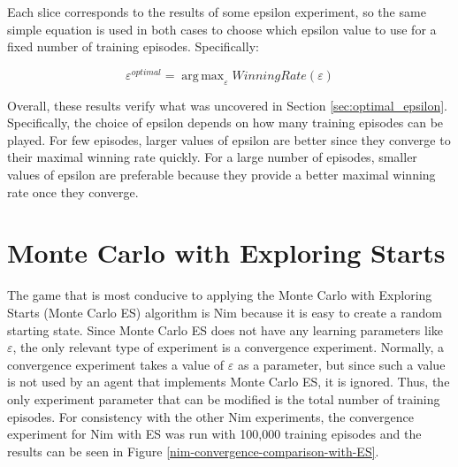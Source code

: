 \documentclass[11pt,a4paper,twoside,openright]{report}
\newcommand{\argmax}{\mathop{\mathrm{arg\,max}}}
\begin{document}
Each slice corresponds to the results of some epsilon experiment, so the same simple equation is used  in both cases to choose which epsilon value to use for a fixed number of training episodes. Specifically:

\begin{equation}
	\varepsilon^{optimal} = \argmax_{\varepsilon} WinningRate(\varepsilon)
\end{equation}

Overall, these results verify what was uncovered in Section \ref{sec:optimal_epsilon}. Specifically, the choice of epsilon depends on how many training episodes can be played. For few episodes, larger values of epsilon are better since they converge to their maximal winning rate quickly. For a large number of episodes, smaller values of epsilon are preferable because they provide a better maximal winning rate once they converge.


\section{Monte Carlo with Exploring Starts}
\label{sec:exploring-starts}

The game that is most conducive to applying the Monte Carlo with Exploring Starts (Monte Carlo ES) algorithm is Nim because it is easy to create a random starting state. Since Monte Carlo ES does not have any learning parameters like $\varepsilon$, the only relevant type of experiment is a convergence experiment. Normally, a convergence experiment takes a value of $\varepsilon$ as a parameter, but since such a value is not used by an agent that implements Monte Carlo ES, it is ignored. Thus, the only experiment parameter that can be modified is the total number of training episodes. For consistency with the other Nim experiments, the convergence experiment for Nim with ES was run with 100,000 training episodes and the results can be seen in Figure \ref{nim-convergence-comparison-with-ES}.
\end{document}

